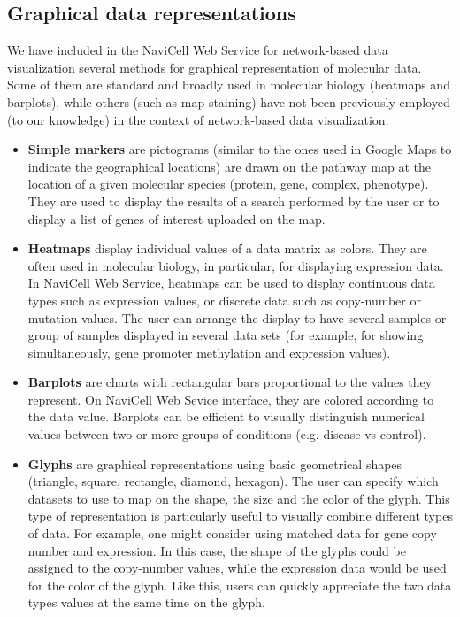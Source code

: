 \documentclass[a4,center,fleqn]{NAR}
\begin{document}
\subsection{Graphical data representations}

We have included in the NaviCell Web Service for network-based data visualization several methods
for graphical representation of molecular data. Some of them are standard
and broadly used in molecular biology (heatmaps and barplots), while others (such as map
staining) have not been previously employed (to our knowledge) in the context of network-based
data visualization.

\begin{itemize}

\item \textbf{Simple markers} are pictograms (similar to the ones used in Google Maps
to indicate the geographical locations) are drawn on the pathway map at the location
of a given molecular species (protein, gene, complex, phenotype). They are used to display the
results of a search performed by the user or to display a list of genes of interest
uploaded on the map.

\item \textbf{Heatmaps} display individual values of a data matrix as
colors. They are often used in molecular biology, in particular, for displaying expression
data. In NaviCell Web Service, heatmaps can be used to
display continuous data types such as expression values, or discrete data such
as copy-number or mutation values. The user can arrange the display to have
several samples or group of samples displayed in several data sets
(for example, for showing simultaneously, gene promoter methylation and expression values).

\item \textbf{Barplots} are charts with rectangular bars proportional to the values
they represent. On NaviCell Web Sevice interface, they are colored according to the
data value. Barplots can be efficient to visually distinguish numerical
values between two or more groups of conditions (e.g. disease vs control).

\item \textbf{Glyphs} are graphical representations using basic geometrical
shapes (triangle, square, rectangle, diamond, hexagon). The user can specify
which datasets to use to map on the shape, the size and the color of the glyph. This
type of representation is particularly useful to visually combine different
types of data. For example, one might consider using matched data for
gene copy number and expression. In this case, the shape of the
glyphs could be assigned to the copy-number values, while the expression data
would be used for the color of the glyph. Like this, users can quickly
appreciate the two data types values at the same time on the glyph.


\end{itemize}
\end{document}
